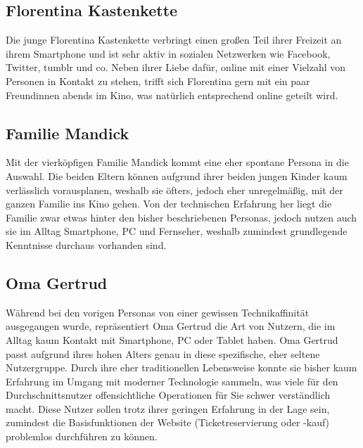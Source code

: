 \subsection{Florentina Kastenkette}
Die junge Florentina Kastenkette verbringt einen großen Teil ihrer Freizeit an ihrem Smartphone und ist sehr aktiv in sozialen Netzwerken wie Facebook, Twitter, tumblr und co.
Neben ihrer Liebe dafür, online mit einer Vielzahl von Personen in Kontakt zu stehen, trifft sich Florentina gern mit ein paar Freundinnen abends im Kino, was natürlich entsprechend online geteilt wird.

\subsection{Familie Mandick}
Mit der vierköpfigen Familie Mandick kommt eine eher spontane Persona in die Auswahl.
Die beiden Eltern können aufgrund ihrer beiden jungen Kinder kaum verlässlich vorausplanen, weshalb sie öfters, jedoch eher unregelmäßig, mit der ganzen Familie ins Kino gehen.
Von der technischen Erfahrung her liegt die Familie zwar etwas hinter den bisher beschriebenen Personas, jedoch nutzen auch sie im Alltag Smartphone, PC und Fernseher, weshalb zumindest grundlegende Kenntnisse durchaus vorhanden sind.

\subsection{Oma Gertrud}
Während bei den vorigen Personas von einer gewissen Technikaffinität ausgegangen wurde, repräsentiert Oma Gertrud die Art von Nutzern, die im Alltag kaum Kontakt mit Smartphone, PC oder Tablet haben.
Oma Gertrud passt aufgrund ihres hohen Alters genau in diese spezifische, eher seltene Nutzergruppe.
Durch ihre eher traditionellen Lebensweise konnte sie bisher kaum Erfahrung im Umgang mit moderner Technologie sammeln, was viele für den Durchschnittsnutzer offensichtliche Operationen für Sie schwer verständlich macht.
Diese Nutzer sollen trotz ihrer geringen Erfahrung in der Lage sein, zumindest die Basisfunktionen der Website (Ticketreservierung oder -kauf) problemlos durchführen zu können.